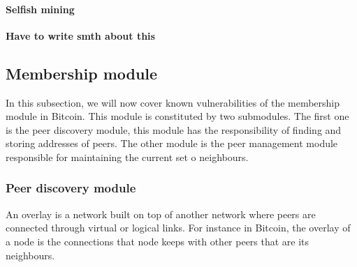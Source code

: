 

\paragraph*{Selfish mining}
\label{sec:selfish}
\textbf{Have to write smth about this}

\subsection{Membership module}
\label{sec:m_module}
In this subsection, we will now cover known vulnerabilities of the membership module in Bitcoin. This module is constituted by two submodules. The first one is the peer discovery module, this module has the responsibility of finding and storing addresses of peers. The other module is the peer management module responsible for maintaining the current set o neighbours.

\subsubsection{Peer discovery module}
\label{sec:peer_disc_module}

\label{sec:secureoverlays}
An overlay is a network built on top of another network where peers are connected through virtual or logical links. For instance in Bitcoin, the overlay of a node is the connections that node keeps with other peers that are its neighbours.


